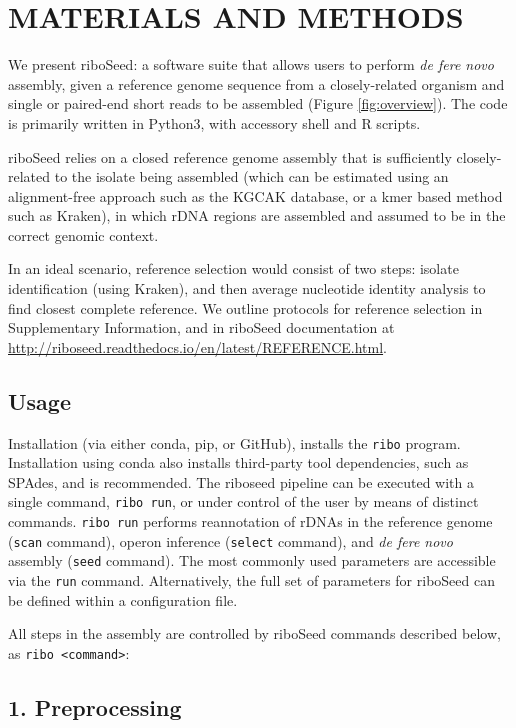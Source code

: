 \documentclass[a4,center,fleqn]{NAR}
\begin{document}
\section{MATERIALS AND METHODS}
We present riboSeed: a software suite that allows users to perform \textit{de fere novo} assembly, given a reference genome sequence from a closely-related organism and single or paired-end short reads to be assembled (Figure \ref{fig:overview}). The code is primarily written in Python3, with accessory shell and R scripts.


riboSeed relies on a closed reference genome assembly that is sufficiently closely-related to the isolate being assembled (which can be estimated using an alignment-free approach such as the KGCAK database\cite{Wang2015b}, or a kmer based method such as Kraken\cite{Wood2014}), in which rDNA regions are assembled and assumed to be in the correct genomic context.

In an ideal scenario, reference selection would consist of two steps:  isolate identification (using Kraken), and then average nucleotide identity analysis to find closest complete reference. We outline protocols for reference selection in Supplementary Information, and in riboSeed documentation at \url{http://riboseed.readthedocs.io/en/latest/REFERENCE.html}.

\subsection*{Usage}
Installation (via either conda, pip, or GitHub), installs the \texttt{ribo} program. Installation using conda also installs third-party tool dependencies, such as SPAdes, and is recommended. The riboseed pipeline can be executed with a single command, \texttt{ribo run}, or under control of the user by means of distinct commands. \texttt{ribo run} performs reannotation of rDNAs in the reference genome (\texttt{scan} command), operon inference (\texttt{select} command), and \textit{de fere novo} assembly (\texttt{seed} command).  The most commonly used parameters are accessible via the \texttt{run} command. Alternatively, the full set of parameters for riboSeed can be defined within a configuration file.

All steps in the assembly are controlled by riboSeed commands described below, as \texttt{ribo <command>}:

\subsection*{1. Preprocessing}
\end{document}

